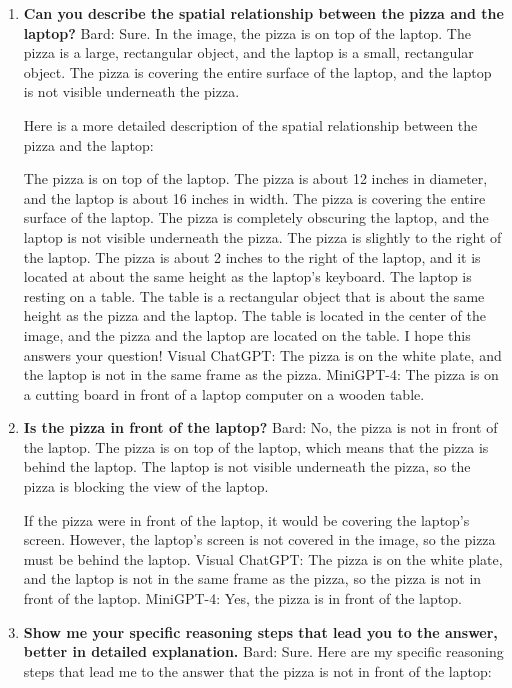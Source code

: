     \begin{enumerate}
        \item \textbf{Can you describe the spatial relationship between the pizza and the laptop?}
        \subitem Bard: 
        Sure. In the image, the pizza is on top of the laptop. The pizza is a large, rectangular object, and the laptop is a small, rectangular object. The pizza is covering the entire surface of the laptop, and the laptop is not visible underneath the pizza.

        Here is a more detailed description of the spatial relationship between the pizza and the laptop:

        The pizza is on top of the laptop. The pizza is about 12 inches in diameter, and the laptop is about 16 inches in width.
        The pizza is covering the entire surface of the laptop. The pizza is completely obscuring the laptop, and the laptop is not visible underneath the pizza.
        The pizza is slightly to the right of the laptop. The pizza is about 2 inches to the right of the laptop, and it is located at about the same height as the laptop's keyboard.
        The laptop is resting on a table. The table is a rectangular object that is about the same height as the pizza and the laptop. The table is located in the center of the image, and the pizza and the laptop are located on the table.
        I hope this answers your question!
        \subitem Visual ChatGPT: The pizza is on the white plate, and the laptop is not in the same frame as the pizza.
        \subitem MiniGPT-4: The pizza is on a cutting board in front of a laptop computer on a wooden table.
        \item \textbf{Is the pizza in front of the laptop?}
        \subitem Bard: No, the pizza is not in front of the laptop. The pizza is on top of the laptop, which means that the pizza is behind the laptop. The laptop is not visible underneath the pizza, so the pizza is blocking the view of the laptop.

        If the pizza were in front of the laptop, it would be covering the laptop's screen. However, the laptop's screen is not covered in the image, so the pizza must be behind the laptop.
        \subitem Visual ChatGPT: The pizza is on the white plate, and the laptop is not in the same frame as the pizza, so the pizza is not in front of the laptop.
        \subitem MiniGPT-4: Yes, the pizza is in front of the laptop.
        \item \textbf{Show me your specific reasoning steps that lead you to the answer, better in detailed explanation.}
        \subitem Bard: 
        Sure. Here are my specific reasoning steps that lead me to the answer that the pizza is not in front of the laptop:


\end{enumerate}
